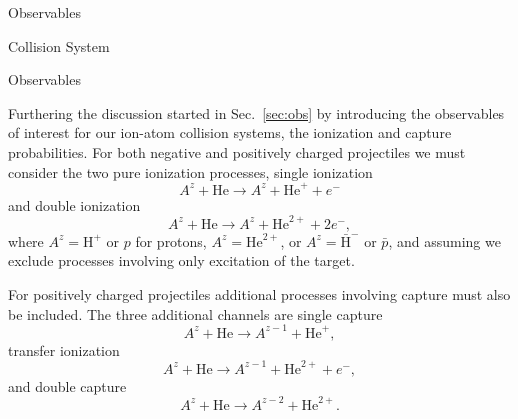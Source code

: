 \documentclass[letterpaper, 11 pt]{report}
\begin{document}
\begin{chapter}{Observables \label{chap:p-he2p-he}}
\begin{section}{Collision System \label{sec:p-he2p-he-sys}}
   \end{section}

   \begin{section}{Observables \label{sec:phe2p-obs}}

      Furthering the discussion started in Sec.~\ref{sec:obs} by introducing the observables of interest
      for our ion-atom collision systems, the ionization and capture probabilities. For both negative
      and positively charged projectiles we must consider the two pure ionization processes, single
      ionization
      \begin{equation} \label{eq:TI}
         A^z + \mathrm{He} \rightarrow A^z + \mathrm{He}^+ + e^-
      \end{equation}
      and double ionization
      \begin{equation} \label{eq:II}
         A^z + \mathrm{He} \rightarrow A^z + \mathrm{He}^{2+} + 2e^-,
      \end{equation}
      where $A^z = \mathrm{H}^+$ or $p$ for protons, $A^z = \mathrm{He}^{2+}$, or $A^z =
      \bar{\mathrm{H}}^-$ or $\bar{p}$, and assuming we exclude processes involving only excitation of
      the target.

      For positively charged projectiles additional processes involving capture must also be included.
      The three additional channels are single capture
      \begin{equation} \label{eq:TP}
         A^z + \mathrm{He} \rightarrow A^{z-1} + \mathrm{He}^{+},
      \end{equation}
      transfer ionization
      \begin{equation} \label{eq:IP}
         A^z + \mathrm{He} \rightarrow A^{z-1} + \mathrm{He}^{2+} + e^-,
      \end{equation}
      and double capture
      \begin{equation} \label{eq:PP}
         A^z + \mathrm{He} \rightarrow A^{z-2} + \mathrm{He}^{2+}.
      \end{equation}


\end{section}
\end{chapter}
\end{document}
